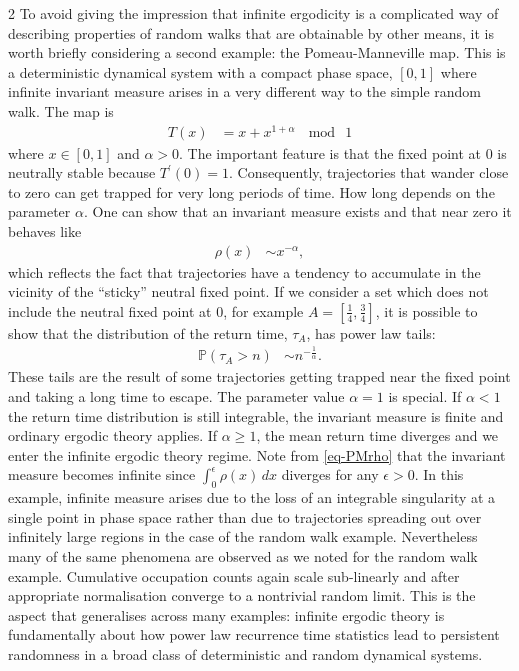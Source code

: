 \documentclass[11pt]{article}
\begin{document}
\begin{multicols}{2}
To avoid giving the impression that infinite ergodicity is a complicated way of describing properties of random walks that are obtainable by other means, it is worth briefly considering a second example: the Pomeau-Manneville map.
This is a deterministic dynamical system with a compact phase space, $\left[0,1\right]$ where infinite invariant measure arises in a very different way to the simple random walk.
The map is
\begin{align}
T(x) &= x + x^{1+\alpha}\ \mod\ 1
\end{align}
where $x \in \left[0,1\right]$ and $\alpha>0$.
The important feature is that the fixed point at $0$ is neutrally stable because $T^\prime(0) = 1$.
Consequently, trajectories that wander close to zero can get trapped for very long periods of time.
How long depends on the parameter $\alpha$.
One can show that an invariant measure exists and that near zero it behaves like
\begin{align}
\label{eq-PMrho}
\rho(x) &\sim x^{-\alpha},
\end{align}
which reflects the fact that trajectories have a tendency to accumulate in the vicinity of the ``sticky'' neutral fixed point.
If we consider a set which does not include the neutral fixed point at $0$, for example $A = \left[ \frac{1}{4}, \frac{3}{4}\right]$, it is possible to show that the distribution of the return time, $\tau_A$, has power law tails:
\begin{align}
\mathbb{P}(\tau_A > n) & \sim n^{-\frac{1}{\alpha}}.
\end{align}
These tails are the result of some trajectories getting trapped near the fixed point and taking a long time to escape.
The parameter value $\alpha=1$ is special.
If $\alpha <1$ the return time distribution is still integrable, the invariant measure is finite and ordinary ergodic theory applies.
If $\alpha \ge1$, the mean return time diverges and we enter the infinite ergodic theory regime.
Note from \eqref{eq-PMrho} that the invariant measure becomes infinite since $\int_0^\epsilon \rho(x)\,dx$ diverges for any $\epsilon > 0$.
In this example, infinite measure arises due to the loss of an integrable singularity at a single point in phase space rather than due to trajectories spreading out over infinitely large regions in the case of the random walk example.
Nevertheless many of the same phenomena are observed as we noted for the random walk example.
Cumulative occupation counts again scale sub-linearly and after appropriate normalisation converge to a nontrivial random limit.
This is the aspect that generalises across many examples: infinite ergodic theory is fundamentally about how power law recurrence time statistics lead to persistent randomness in a broad class of deterministic and random dynamical systems.


\end{multicols}
\end{document}
